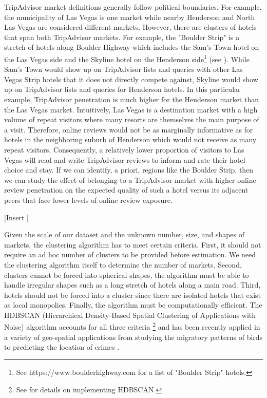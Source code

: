\documentclass{informs_mod} %
\begin{document}
TripAdvisor market definitions generally follow political boundaries. For example, the municipality of Las Vegas is one market while nearby Henderson and North Las Vegas are considered different markets. However, there are clusters of hotels that span both TripAdvisor markets. For example, the "Boulder Strip" is a stretch of hotels along Boulder Highway which includes the Sam's Town hotel on the Las Vegas side and the Skyline hotel on the Henderson side\footnote{See https://www.boulderhighway.com for a list of "Boulder Strip" hotels.} (see ). While Sam's Town would show up on TripAdvisor lists and queries with other Las Vegas Strip hotels that it does not directly compete against, Skyline would show up on TripAdvisor lists and queries for Henderson hotels. In this particular example, TripAdvisor penetration is much higher for the Henderson market than the Las Vegas market. Intuitively, Las Vegas is a destination market with a high volume of repeat visitors where many resorts are themselves the main purpose of a visit. Therefore, online reviews would not be as marginally informative as for hotels in the neighboring suburb of Henderson which would not receive as many repeat visitors. Consequently, a relatively lower proportion of visitors to Las Vegas will read and write TripAdvisor reviews to inform and rate their hotel choice and stay. If we can identify, a priori, regions like the Boulder Strip, then we can study the effect of belonging to a TripAdvisor market with higher online review penetration on the expected quality of such a hotel versus its adjacent peers that face lower levels of online review exposure.

[Insert ]

Given the scale of our dataset and the unknown number, size, and shapes of markets, the clustering algorithm has to meet certain criteria. First, it should not require an ad hoc number of clusters to be provided before estimation. We need the clustering algorithm itself to determine the number of markets. Second, clusters cannot be forced into spherical shapes, the algorithm must be able to handle irregular shapes such as a long stretch of hotels along a main road. Third, hotels should not be forced into a cluster since there are isolated hotels that exist as local monopolies. Finally, the algorithm must be computationally efficient.  The HDBSCAN (Hierarchical Density-Based Spatial Clustering of Applications with Noise) algorithm accounts for all three criteria \citep{campello2013density,mcinnes2017hdbscan}\footnote{See \citet{mcinnes2017hdbscan} for details on implementing HDBSCAN.} and has been recently applied in a variety of geo-spatial applications from studying the migratory patterns of birds \citep{tang2009discovery} to predicting the location of crimes \citep{bappee2018predicting}.  
\end{document}
